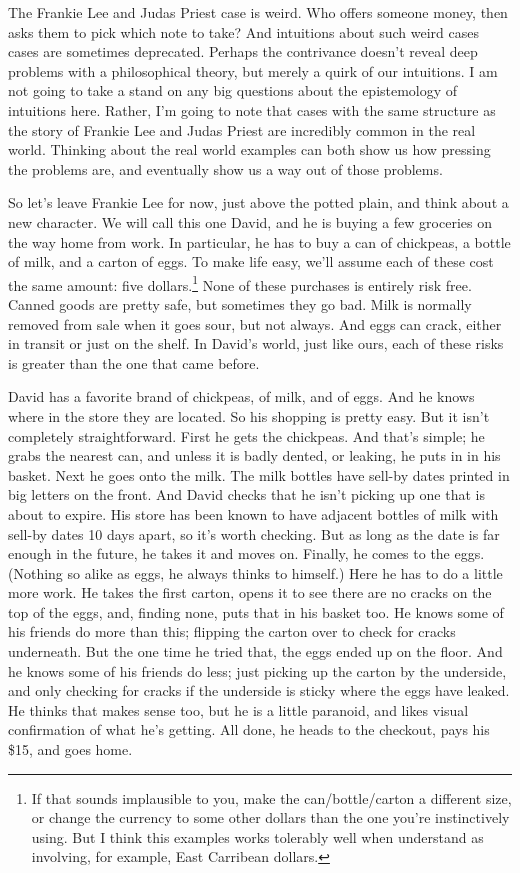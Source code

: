 \documentclass[
  11pt,
  letterpaper,
  DIV=11,
  numbers=noendperiod,
  twoside]{scrartcl}
\begin{document}
The Frankie Lee and Judas Priest case is weird. Who offers someone
money, then asks them to pick which note to take? And intuitions about
such weird cases cases are sometimes deprecated. Perhaps the contrivance
doesn't reveal deep problems with a philosophical theory, but merely a
quirk of our intuitions. I am not going to take a stand on any big
questions about the epistemology of intuitions here. Rather, I'm going
to note that cases with the same structure as the story of Frankie Lee
and Judas Priest are incredibly common in the real world. Thinking about
the real world examples can both show us how pressing the problems are,
and eventually show us a way out of those problems.

So let's leave Frankie Lee for now, just above the potted plain, and
think about a new character. We will call this one David, and he is
buying a few groceries on the way home from work. In particular, he has
to buy a can of chickpeas, a bottle of milk, and a carton of eggs. To
make life easy, we'll assume each of these cost the same amount: five
dollars.\footnote{If that sounds implausible to you, make the
  can/bottle/carton a different size, or change the currency to some
  other dollars than the one you're instinctively using. But I think
  this examples works tolerably well when understand as involving, for
  example, East Carribean dollars.} None of these purchases is entirely
risk free. Canned goods are pretty safe, but sometimes they go bad. Milk
is normally removed from sale when it goes sour, but not always. And
eggs can crack, either in transit or just on the shelf. In David's
world, just like ours, each of these risks is greater than the one that
came before.

David has a favorite brand of chickpeas, of milk, and of eggs. And he
knows where in the store they are located. So his shopping is pretty
easy. But it isn't completely straightforward. First he gets the
chickpeas. And that's simple; he grabs the nearest can, and unless it is
badly dented, or leaking, he puts in in his basket. Next he goes onto
the milk. The milk bottles have sell-by dates printed in big letters on
the front. And David checks that he isn't picking up one that is about
to expire. His store has been known to have adjacent bottles of milk
with sell-by dates 10 days apart, so it's worth checking. But as long as
the date is far enough in the future, he takes it and moves on. Finally,
he comes to the eggs. (Nothing so alike as eggs, he always thinks to
himself.) Here he has to do a little more work. He takes the first
carton, opens it to see there are no cracks on the top of the eggs, and,
finding none, puts that in his basket too. He knows some of his friends
do more than this; flipping the carton over to check for cracks
underneath. But the one time he tried that, the eggs ended up on the
floor. And he knows some of his friends do less; just picking up the
carton by the underside, and only checking for cracks if the underside
is sticky where the eggs have leaked. He thinks that makes sense too,
but he is a little paranoid, and likes visual confirmation of what he's
getting. All done, he heads to the checkout, pays his \$15, and goes
home.
\end{document}
